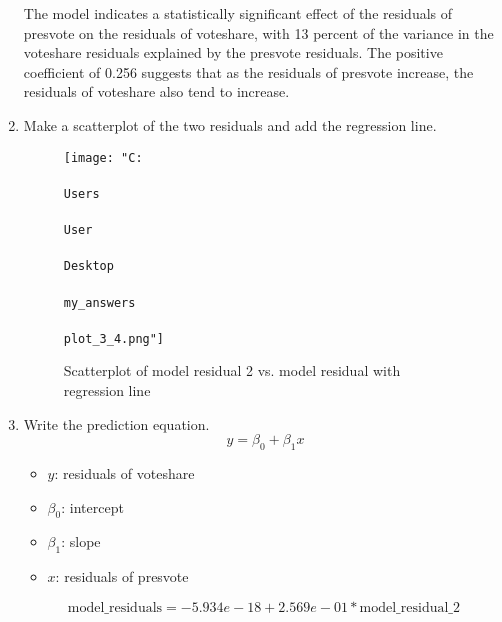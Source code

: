 \documentclass[12pt,letterpaper]{article}
\begin{document}
\begin{enumerate}
\begin{Verbatim}
		\end{Verbatim}
		The model indicates a statistically significant effect of the residuals of presvote on the residuals of voteshare, with 13 percent of the variance in the voteshare residuals explained by the presvote residuals. The positive coefficient of 0.256 suggests that as the residuals of presvote increase, the residuals of voteshare also tend to increase.
		\item Make a scatterplot of the two residuals and add the regression line. 
		
		\begin{figure}[h!]
			\centering
			\texttt{[image: "C:\\\\Users\\\\User\\\\Desktop\\\\my\_answers\\\\plot\_3\_4.png"]}
			\caption{Scatterplot of model residual 2 vs. model residual with regression line}
			\label{fig:plot_2}
		\end{figure}
			\vspace{6cm}
		\item Write the prediction equation.
			\begin{equation}
			\ y = \beta_0 + \beta_1 x
		\end{equation}
		\begin{itemize}
			\item \( y \): residuals of voteshare
			\item \(\beta_0\): intercept
			\item \(\beta_1 \): slope
			\item \( x \): residuals of presvote
			\end{itemize}
			\begin{equation}
				\text{model\_residuals} = -5.934e-18+2.569e-01*\text{model\_residual\_2}
			\end{equation}
		
		
		
		
	\end{enumerate}
	
\end{document}
